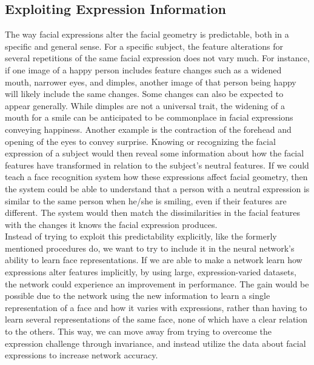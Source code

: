 \subsection{Exploiting Expression Information}

The way facial expressions alter the facial geometry is predictable, both in a specific and general sense. For a specific subject, the feature alterations for several repetitions of the same facial expression does not vary much. For instance, if one image of a happy person includes feature changes such as a widened mouth, narrower eyes, and dimples, another image of that person being happy will likely include the same changes. Some changes can also be expected to appear generally. While dimples are not a universal trait, the widening of a mouth for a smile can be anticipated to be commonplace in facial expressions conveying happiness. Another example is the contraction of the forehead and opening of the eyes to convey surprise. Knowing or recognizing the facial expression of a subject would then reveal some information about how the facial features have transformed in relation to the subject’s neutral features. If we could teach a face recognition system how these expressions affect facial geometry, then the system could be able to understand that a person with a neutral expression is similar to the same person when he/she is smiling, even if their features are different. The system would then match the dissimilarities in the facial features with the changes it knows the facial expression produces. \\

\noindent Instead of trying to exploit this predictability explicitly, like the formerly mentioned procedures do, we want to try to include it in the neural network's ability to learn face representations. If we are able to make a network learn how expressions alter features implicitly, by using large, expression-varied datasets, the network could experience an improvement in performance. The gain would be possible due to the network using the new information to learn a single representation of a face and how it varies with expressions, rather than having to learn several representations of the same face, none of which have a clear relation to the others. This way, we can move away from trying to overcome the expression challenge through invariance, and instead utilize the data about facial expressions to increase network accuracy.


\cleardoublepage